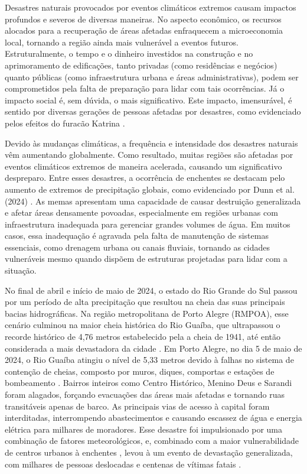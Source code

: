Desastres naturais provocados por eventos climáticos extremos causam impactos profundos e severos de diversas maneiras.
No aspecto econômico, os recursos alocados para a recuperação de áreas afetadas enfraquecem a microeconomia local,
tornando a região ainda mais vulnerável a eventos futuros. Estruturalmente, o tempo e o dinheiro investidos na
construção e no aprimoramento de edificações, tanto privadas (como residências e negócios) quanto públicas (como
infraestrutura urbana e áreas administrativas), podem ser comprometidos pela falta de preparação para lidar com tais
ocorrências. Já o impacto social é, sem dúvida, o mais significativo. Este impacto, imensurável, é sentido por diversas
gerações de pessoas afetadas por desastres, como evidenciado pelos efeitos do furacão Katrina
\cite{reardon}\cite{neria}.

Devido às mudanças climáticas, a frequência e intensidade dos desastres naturais vêm aumentando globalmente. Como
resultado, muitas regiões são afetadas por eventos climáticos extremos de maneira acelerada, causando um significativo
despreparo. Entre esses desastres, a ocorrência de enchentes se destacam pelo aumento de extremos de precipitação
globais, como evidenciado por Dunn et al. (2024) \cite{dunn}. As memas apresentam uma capacidade de causar destruição
generalizada e afetar áreas densamente povoadas, especialmente em regiões urbanas com infraestrutura inadequada para
gerenciar grandes volumes de água. Em muitos casos, essa inadequação é agravada pela falta de manutenção de sistemas
essenciais, como drenagem urbana ou canais fluviais, tornando as cidades vulneráveis mesmo quando dispõem de estruturas
projetadas para lidar com a situação. 

No final de abril e início de maio de 2024, o estado do Rio Grande do Sul passou por um período de alta precipitação que
resultou na cheia das suas principais bacias hidrográficas. Na região metropolitana de Porto Alegre (RMPOA), esse
cenário culminou na maior cheia histórica do Rio Guaíba, que ultrapassou o recorde histórico de 4,76 metros estabelecido
pela a cheia de 1941, até então considerada a mais devastadora da cidade \cite{dep}. Em Porto Alegre, no dia 5 de maio
de 2024, o Rio Guaíba atingiu o nível de 5,33 metros devido à falhas no sistema de contenção de cheias, composto por
muros, diques, comportas e estações de bombeamento \cite{comercio}. Bairros inteiros como Centro Histórico, Menino Deus
e Sarandi foram alagados, forçando evacuações das áreas mais afetadas e tornando ruas transitáveis apenas de barco. As
principais vias de acesso à capital foram interditadas, interrompendo abastecimentos e causando escassez de água e
energia elétrica para milhares de moradores. Esse desastre foi impulsionado por uma combinação de fatores
meteorológicos, e, combinado com a maior vulnerabilidade de centros urbanos à enchentes
\cite{yang}\cite{hammond}\cite{zhang}\cite{pereira}, levou à um evento de devastação generalizada, com milhares de
pessoas deslocadas e centenas de vítimas fatais \cite{alcantara}.

